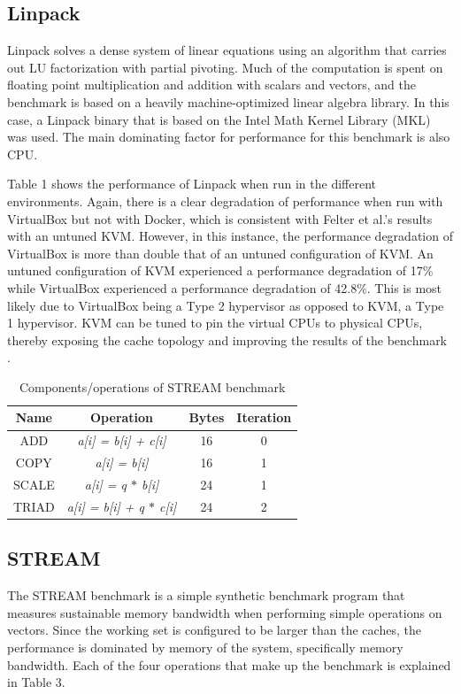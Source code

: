 \documentclass{sig-alternate-10pt}
\begin{document}
\subsection{Linpack}
Linpack solves a dense system of linear equations using an algorithm that carries out LU factorization with partial pivoting\cite{felter:2014}\cite{hpcchallenge}. Much of the computation is spent on floating point multiplication and addition with scalars and vectors, and the benchmark is based on a heavily machine-optimized linear algebra library. In this case, a Linpack binary that is based on the Intel Math Kernel Library (MKL) was used. The main dominating factor for performance for this benchmark is also CPU.

Table 1 shows the performance of Linpack when run in the different environments. Again, there is a clear degradation of performance when run with VirtualBox but not with Docker, which is consistent with Felter et al.'s results with an untuned KVM. However, in this instance, the performance degradation of VirtualBox is more than double that of an untuned configuration of KVM. An untuned configuration of KVM experienced a performance degradation of 17\%\cite{felter:2014} while VirtualBox experienced a performance degradation of 42.8\%. This is most likely due to VirtualBox being a Type 2 hypervisor as opposed to KVM, a Type 1 hypervisor. KVM can be tuned to pin the virtual CPUs to physical CPUs, thereby exposing the cache topology and improving the results of the benchmark \cite{felter:2014}. 

\begin{table}
\centering
\begin{tabular}{|c|c|c|c|} \hline
Name & Operation & Bytes & Iteration \\ \hline
ADD & \textit{a[i] = b[i] + c[i]} & 16 & 0 \\ \hline
COPY & \textit{a[i] = b[i]} & 16 & 1 \\ \hline
SCALE & \textit{a[i] = q $*$ b[i]} & 24 & 1 \\ \hline
TRIAD & \textit{a[i] = b[i] + q $*$ c[i]} & 24 & 2 \\
\hline\end{tabular}
\captionsetup{justification=centering}
\caption{Components/operations of STREAM benchmark}
\end{table}

\subsection{STREAM}
The STREAM benchmark is a simple synthetic benchmark program that measures sustainable memory bandwidth when performing simple operations on vectors. Since the working set is configured to be larger than the caches, the performance is dominated by memory of the system, specifically memory bandwidth. Each of the four operations that make up the benchmark is explained in Table 3.
\end{document}
